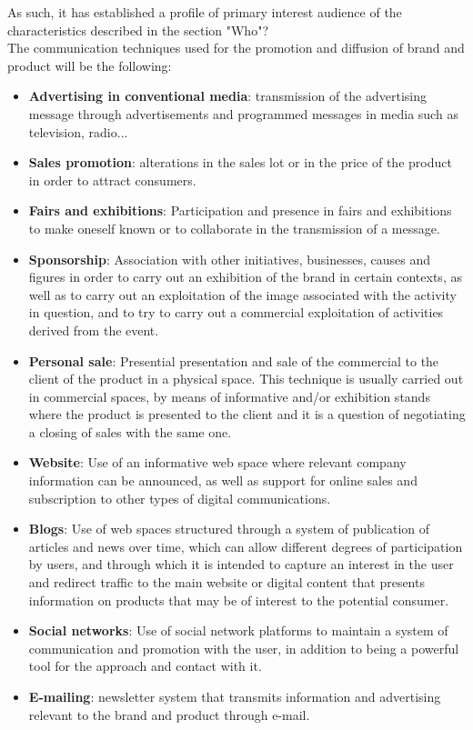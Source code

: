 \documentclass[11pt,a4paper]{article}
\begin{document}
As such, it has established a profile of primary interest audience of the characteristics described in the section "Who"?\\ 

The communication techniques used for the promotion and diffusion of brand and product will be the following:\\
\begin{itemize}
\item \textbf{Advertising in conventional media}: transmission of the advertising message through advertisements and programmed messages in media such as television, radio...
\item \textbf{Sales promotion}: alterations in the sales lot or in the price of the product in order to attract consumers.
\item \textbf{Fairs and exhibitions}: Participation and presence in fairs and exhibitions to make oneself known or to collaborate in the transmission of a message. 
\item \textbf{Sponsorship}: Association with other initiatives, businesses, causes and figures in order to carry out an exhibition of the brand in certain contexts, as well as to carry out an exploitation of the image associated with the activity in question, and to try to carry out a commercial exploitation of activities derived from the event.
\item \textbf{Personal sale}: Presential presentation and sale of the commercial to the client of the product in a physical space. This technique is usually carried out in commercial spaces, by means of informative and/or exhibition stands where the product is presented to the client and it is a question of negotiating a closing of sales with the same one. 
\item \textbf{Website}: Use of an informative web space where relevant company information can be announced, as well as support for online sales and subscription to other types of digital communications.
\item \textbf{Blogs}: Use of web spaces structured through a system of publication of articles and news over time, which can allow different degrees of participation by users, and through which it is intended to capture an interest in the user and redirect traffic to the main website or digital content that presents information on products that may be of interest to the potential consumer.
\item \textbf{Social networks}: Use of social network platforms to maintain a system of communication and promotion with the user, in addition to being a powerful tool for the approach and contact with it.
\item \textbf{E-mailing}: newsletter system that transmits information and advertising relevant to the brand and product through e-mail. 
\end{itemize}
\end{document}

